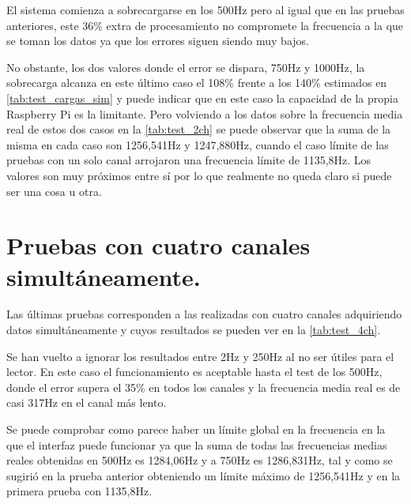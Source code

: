 	El sistema comienza a sobrecargarse en los 500Hz pero al igual que en las pruebas anteriores, este 36\% extra de procesamiento no compromete la frecuencia a la que se toman los datos ya que los errores siguen siendo muy bajos.
	
	No obstante, los dos valores donde el error se dispara, 750Hz y 1000Hz, la sobrecarga alcanza en este último caso el 108\%  frente a los 140\% estimados en  \ref{tab:test_cargas_sim} y puede indicar que en este caso la capacidad de la propia Raspberry Pi es la limitante. Pero volviendo a los datos sobre la frecuencia media real de estos dos casos en la \autoref{tab:test_2ch} se puede observar que la suma de la misma en cada caso son 1256,541Hz y 1247,880Hz, cuando el caso límite de las pruebas con un solo canal arrojaron una frecuencia límite de 1135,8Hz. Los valores son muy próximos entre sí por lo que realmente no queda claro si puede ser una cosa u otra.



\section{Pruebas con cuatro canales simultáneamente.}
Las últimas pruebas corresponden a las realizadas con cuatro canales adquiriendo datos simultáneamente y cuyos resultados se pueden ver en la \autoref{tab:test_4ch}.

	Se han vuelto a ignorar los resultados entre 2Hz y 250Hz al no ser útiles para el lector. En este caso el funcionamiento es aceptable hasta el test de los 500Hz, donde el error supera el 35\% en todos los canales y la frecuencia media real es de casi 317Hz en el canal más lento. 
	
	Se puede comprobar como parece haber un límite global en la frecuencia en la que el interfaz puede funcionar ya que la suma de todas las frecuencias medias reales obtenidas en 500Hz es 1284,06Hz y a 750Hz es 1286,831Hz, tal y como se sugirió en la prueba anterior obteniendo un límite máximo de 1256,541Hz y en la primera prueba con 1135,8Hz.
	
	
	
